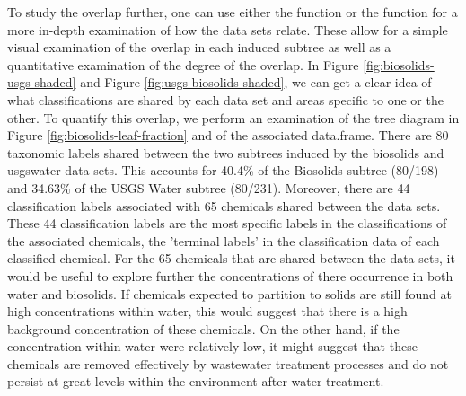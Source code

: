 \documentclass[article]{jss}
\newcommand{\fct}[1]{\code{#1()}}
\begin{document}
To study the overlap further, one can use either the function \fct{data\_set\_subtrees} or the function \fct{leaf\_fraction\_subtree} for a more in-depth examination of how the data sets relate. These allow for a simple visual examination of the overlap in each induced subtree as well as a quantitative examination of the degree of the overlap. In Figure \ref{fig:biosolids-usgs-shaded} and Figure \ref{fig:usgs-biosolids-shaded}, we can get a clear idea of what classifications are shared by each data set and areas specific to one or the other. To quantify this overlap, we perform an examination of the tree diagram in Figure \ref{fig:biosolids-leaf-fraction} and of the associated data.frame. There are 80 taxonomic labels shared between the two subtrees induced by the biosolids and usgswater data sets. This accounts for 40.4\% of the Biosolids subtree (80/198) and 34.63\% of the USGS Water subtree (80/231). Moreover, there are 44 classification labels associated with 65 chemicals shared between the data sets. These 44 classification labels are the most specific labels in the classifications of the associated chemicals, the 'terminal labels' in the classification data of each classified chemical. For the 65 chemicals that are shared between the data sets, it would be useful to explore further the concentrations of there occurrence in both water and biosolids. If chemicals expected to partition to solids are still found at high concentrations within water, this would suggest that there is a high background concentration of these chemicals. On the other hand, if the concentration within water were relatively low, it might suggest that these chemicals are removed effectively by wastewater treatment processes and do not persist at great levels within the environment after water treatment.
\end{document}
